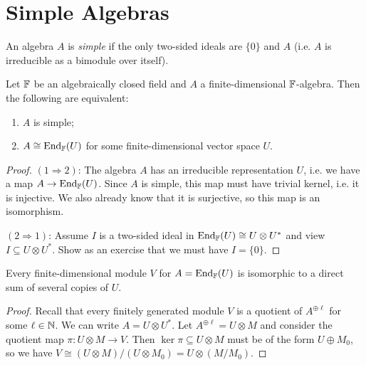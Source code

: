 \section{Simple Algebras}

\begin{definition}
  An algebra $A$ is \emph{simple} if
  the only two-sided ideals are
  $\{0\}$ and $A$ (i.e. $A$ is irreducible
  as a bimodule over itself).
\end{definition}

\begin{theorem}
  Let $\mathbb{F}$ be an algebraically closed
  field and $A$ a finite-dimensional
  $\mathbb{F}$-algebra. Then the following are
  equivalent:
  \begin{enumerate}
    \item $A$ is simple;
    \item $A \cong \operatorname{End}_{\mathbb{F}}(U)$ for
      some finite-dimensional vector space
      $U$.
  \end{enumerate}
\end{theorem}

\begin{proof}
  $(1 \Rightarrow 2)$: The algebra
  $A$ has an irreducible representation
  $U$, i.e. we have a map
  $A \to \operatorname{End}_{\mathbb{F}}(U)$. Since $A$ is
  simple, this map must have trivial kernel,
  i.e. it is injective.
  We also already
  know that it is surjective, so
  this map is an isomorphism.

  $(2 \Rightarrow 1)$: Assume $I$ is a
  two-sided ideal in $\operatorname{End}_{\mathbb{F}}(U) \cong U \otimes U^*$
  and view $I \subseteq U \otimes U^*$.
  Show as an exercise
  that we must have $I = \{0\}$.
\end{proof}

\begin{theorem}
  Every finite-dimensional module
  $V$ for $A = \operatorname{End}_{\mathbb{F}}(U)$ is isomorphic
  to a direct sum of several copies of $U$.
\end{theorem}

\begin{proof}
  Recall that every finitely generated
  module $V$ is a quotient of
  $A^{\oplus \ell}$ for some $\ell \in \mathbb{N}$.
  We can write $A = U \otimes U^*$.
  Let $A^{\oplus \ell} = U \otimes M$ and
  consider the quotient map
  $\pi : U \otimes M \to V$. Then
  $\ker \pi \subseteq U \otimes M$
  must be of the form
  $U \oplus M_0$, so
  we have $V \cong (U \otimes M) / (U \otimes M_0) = U \otimes (M / M_0)$.
\end{proof}
